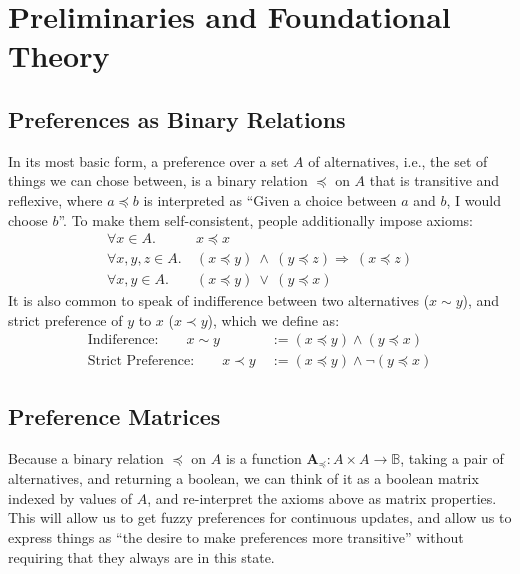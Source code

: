 \documentclass{article}
\theoremstyle{plain}
\theoremstyle{definition}
\theoremstyle{remark}
\newcommand\leqc{\preccurlyeq}
\newcommand\mat[1]{\mathbf #1}
\begin{document}
	
	
	
	
	\section{Preliminaries and Foundational Theory}
	\subsection{Preferences as Binary Relations}
	In its most basic form, a preference over a set $A$ of alternatives, i.e., the set of things we can chose between, is a binary relation $\leqc$ on $A$ that is transitive and reflexive, where $a \leqc b$ is interpreted as ``Given a choice between $a$ and $b$, I would choose $b$''. To make them self-consistent, people additionally impose axioms:
	\begin{align*}
	\forall x \in A.&~x \leqc x \tag{Reflexivity}\\
	\forall x,y,z \in A.&~(x\leqc y)~\land~( y \leqc z) \Rightarrow~(x \leqc z) \tag{Transitivity}\\
	\forall x, y \in A. &~ (x\leqc y)~\lor~( y \leqc x) \tag{Completeness}
	\end{align*}
	It is also common to speak of indifference between two alternatives ($x \sim y$), and strict preference of $y$ to $x$ ($x \prec y$), which we define as:
	\begin{align*}
		\text{Indiference:}\qquad x \sim y &~:= (x \leqc y) \land (y \leqc x)\\
		\text{Strict Preference:}\qquad x \prec y &~:= (x \leqc y) \land \lnot (y \leqc x)
	\end{align*}
	
	\subsection{Preference Matrices}
	Because a binary relation $\leqc$ on $A$ is a function $\mat A_\leqc: A \times A \to \mathbb{B}$, taking a pair of alternatives, and returning a boolean, we can think of it as a boolean matrix indexed by values of $A$, and re-interpret the axioms above as matrix properties. This will allow us to get fuzzy preferences for continuous updates, and allow us to express things as ``the desire to make preferences more transitive'' without requiring that they always are in this state. 
	
\end{document}
